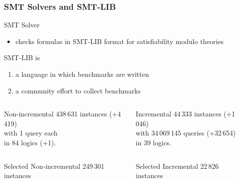 \documentclass[table]{beamer}
\def\emph#1{\textcolor{MYblue}{#1}}
\begin{document}
\begin{frame}
  \frametitle{SMT Solvers and SMT-LIB}
  SMT Solver
  \begin{itemize}
  \item checks formulas
    in \emph{SMT-LIB} format
    for \emph{satisfiability modulo theories}
  \end{itemize}
  \bigskip

  SMT-LIB is
  \begin{enumerate}
  \item a \emph{language} in which benchmarks are written
  \item a community effort to \emph{collect benchmarks}
  \end{enumerate}
  \medskip

  \begin{columns}
    \begin{column}{0.4\textwidth}
      \begin{block}{Non-incremental}
        438\,631 instances {\small (+4\,419)}\\ %
        with 1 query each \\
        in 84 logics {\small (+1)}.
      \end{block}
    \end{column}
    \begin{column}{0.4\textwidth}
      \begin{block}{Incremental}
        44\,333 instances {\small (+1\,046)}\\ %
        with 34\,069\,145 queries {\small (+32\,654)} \\ %
        in 39 logics. %
      \end{block}
    \end{column}
    \begin{column}{0.08\textwidth}
    \end{column}
  \end{columns}
  \pause
    \begin{columns}
    \begin{column}{0.4\textwidth}
      \begin{block}{Selected Non-incremental}
        249\,301 instances %
      \end{block}
    \end{column}
    \begin{column}{0.4\textwidth}
      \begin{block}{Selected Incremental}
        22\,826 instances %
      \end{block}
    \end{column}
    \begin{column}{0.08\textwidth}
    \end{column}
  \end{columns}

\end{frame}
\end{document}
